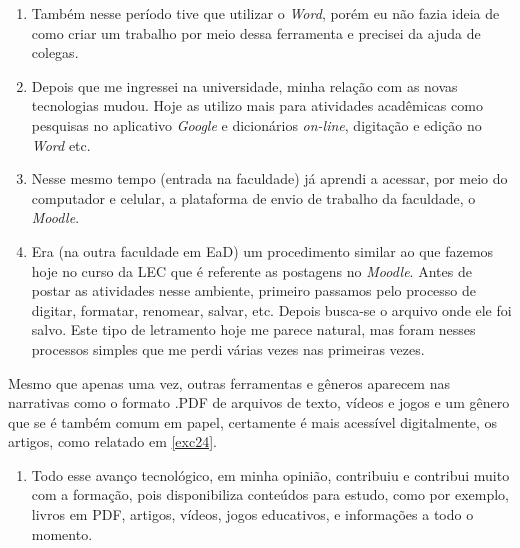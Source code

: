 \documentclass{textolivre}
\begin{document}
\begin{enumerate}[resume,label={(\arabic*)},ref={\arabic*},topsep=1ex,partopsep=1ex]
\item\label{exc20} Também nesse período tive que utilizar o \textit{Word}, porém eu não fazia ideia de como criar um trabalho por meio dessa ferramenta e precisei da ajuda de colegas.
\item\label{exc21} Depois que me ingressei na universidade, minha relação com as novas tecnologias mudou. Hoje as utilizo mais para atividades acadêmicas como pesquisas no  aplicativo \textit{Google} e dicionários \textit{on-line}, digitação e edição no \textit{Word} etc.
\item\label{exc22} Nesse mesmo tempo (entrada na faculdade) já aprendi a acessar, por meio do computador e celular, a plataforma de envio de trabalho da faculdade, o \textit{Moodle}.
\item\label{exc23} Era (na outra faculdade em EaD) um procedimento similar ao que fazemos hoje no curso da LEC que é referente as postagens no \textit{Moodle}. Antes de postar as atividades nesse ambiente, primeiro passamos pelo processo de digitar, formatar, renomear, salvar, etc. Depois busca-se o arquivo onde ele foi salvo. Este tipo de letramento hoje me parece natural, mas foram nesses processos simples que me perdi várias vezes nas primeiras vezes.
\end{enumerate}

Mesmo que apenas uma vez, outras ferramentas e gêneros aparecem nas narrativas como o formato .PDF de arquivos de texto, vídeos e jogos e um gênero que se é também comum em papel, certamente é mais acessível digitalmente, os artigos, como relatado em \ref{exc24}.


\begin{enumerate}[resume,label={(\arabic*)},ref={\arabic*},topsep=1ex,partopsep=1ex]
\item\label{exc24} Todo esse avanço tecnológico, em minha opinião, contribuiu e contribui muito com a formação, pois disponibiliza conteúdos para estudo, como por exemplo, livros em PDF, artigos, vídeos, jogos educativos, e informações a todo o momento.
\end{enumerate}
\end{document}
